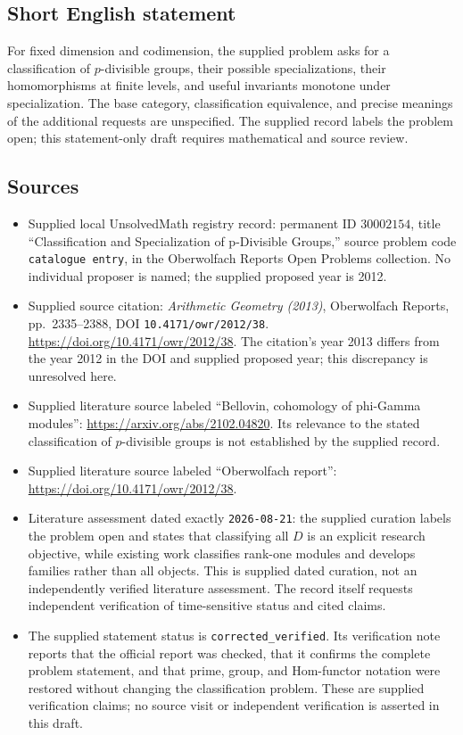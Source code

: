 \documentclass[11pt]{article}
\begin{document}
\subsection{Short English statement}
For fixed dimension and codimension, the supplied problem asks for a classification of \(p\)-divisible groups, their possible specializations, their homomorphisms at finite levels, and useful invariants monotone under specialization. The base category, classification equivalence, and precise meanings of the additional requests are unspecified. The supplied record labels the problem open; this statement-only draft requires mathematical and source review.
\subsection{Sources}
\begin{itemize}
\item Supplied local UnsolvedMath registry record: permanent ID \(30002154\), title ``Classification and Specialization of p-Divisible Groups,'' source problem code \texttt{catalogue entry}, in the Oberwolfach Reports Open Problems collection. No individual proposer is named; the supplied proposed year is 2012.
\item Supplied source citation: \emph{Arithmetic Geometry (2013)}, Oberwolfach Reports, pp.\ 2335--2388, DOI \texttt{10.4171/owr/2012/38}. \url{https://doi.org/10.4171/owr/2012/38}. The citation's year 2013 differs from the year 2012 in the DOI and supplied proposed year; this discrepancy is unresolved here.
\item Supplied literature source labeled ``Bellovin, cohomology of phi-Gamma modules'': \url{https://arxiv.org/abs/2102.04820}. Its relevance to the stated classification of \(p\)-divisible groups is not established by the supplied record.
\item Supplied literature source labeled ``Oberwolfach report'': \url{https://doi.org/10.4171/owr/2012/38}.
\item Literature assessment dated exactly \texttt{2026-08-21}: the supplied curation labels the problem open and states that classifying all \(D\) is an explicit research objective, while existing work classifies rank-one modules and develops families rather than all objects. This is supplied dated curation, not an independently verified literature assessment. The record itself requests independent verification of time-sensitive status and cited claims.
\item The supplied statement status is \texttt{corrected\_verified}. Its verification note reports that the official report was checked, that it confirms the complete problem statement, and that prime, group, and Hom-functor notation were restored without changing the classification problem. These are supplied verification claims; no source visit or independent verification is asserted in this draft.
\end{itemize}
\end{document}
